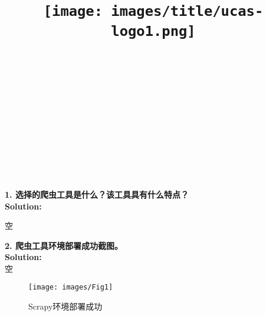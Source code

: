 \documentclass{article}
\title{
	\texttt{[image: images/title/ucas-logo1.png]}\\
    \vspace{1in}
    \textmd{\textbf{\hmwkClass\ \hmwkTitle}}\\
    \textmd{\textbf{\hmwkSubTitle}}\\
    \normalsize\vspace{0.1in}\small{\hmwkCompleteTime }\\
    \vspace{0.1in}\large{\textit{\hmwkClassInstructor\ }}\\
    \vspace{3in}
}
\author{\hmwkAuthorName \\ 
	\hmwkAuthorStuID}
\date{}
\begin{document}
\maketitle


%


\pagebreak

\begin{homeworkProblem}
\textbf{1.	选择的爬虫工具是什么？该工具具有什么特点？}\\
	\textbf{Solution:}\\
	{\color{blue}空
		
	}
\end{homeworkProblem}


\begin{homeworkProblem}
	\textbf{2.	爬虫工具环境部署成功截图。}\\
	\textbf{Solution:}\\
	{\color{blue}空}
	\begin{figure}[H]  %
		\centering
		\texttt{[image: images/Fig1]}
		\caption{Scrapy环境部署成功}
		\label{fig:ucas-logo}
	\end{figure}
	
\end{homeworkProblem}


\pagebreak
\end{document}
